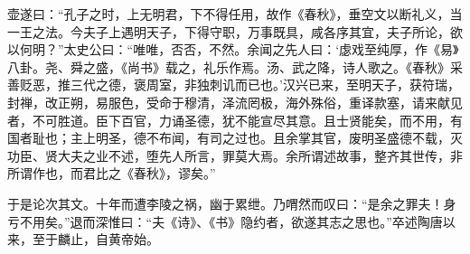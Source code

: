 \documentclass[12pt,UTF8]{ctexbook}
\begin{document}
壶遂曰：“孔子之时，上无明君，下不得任用，故作《春秋》，垂空文以断礼义，当一王之法。今夫子上遇明天子，下得守职，万事既具，咸各序其宜，夫子所论，欲以何明？”太史公曰：“唯唯，否否，不然。余闻之先人曰：‘虙戏至纯厚，作《易》八卦。尧、舜之盛，《尚书》载之，礼乐作焉。汤、武之降，诗人歌之。《春秋》采善贬恶，推三代之德，褒周室，非独刺讥而已也。’汉兴已来，至明天子，获符瑞，封禅，改正朔，易服色，受命于穆清，泽流罔极，海外殊俗，重译款塞，请来献见者，不可胜道。臣下百官，力诵圣德，犹不能宣尽其意。且士贤能矣，而不用，有国者耻也；主上明圣，德不布闻，有司之过也。且余掌其官，废明圣盛德不载，灭功臣、贤大夫之业不述，堕先人所言，罪莫大焉。余所谓述故事，整齐其世传，非所谓作也，而君比之《春秋》，谬矣。”



于是论次其文。十年而遭李陵之祸，幽于累绁。乃喟然而叹曰：“是余之罪夫！身亏不用矣。”退而深惟曰：“夫《诗》、《书》隐约者，欲遂其志之思也。”卒述陶唐以来，至于麟止，自黄帝始。
\end{document}
